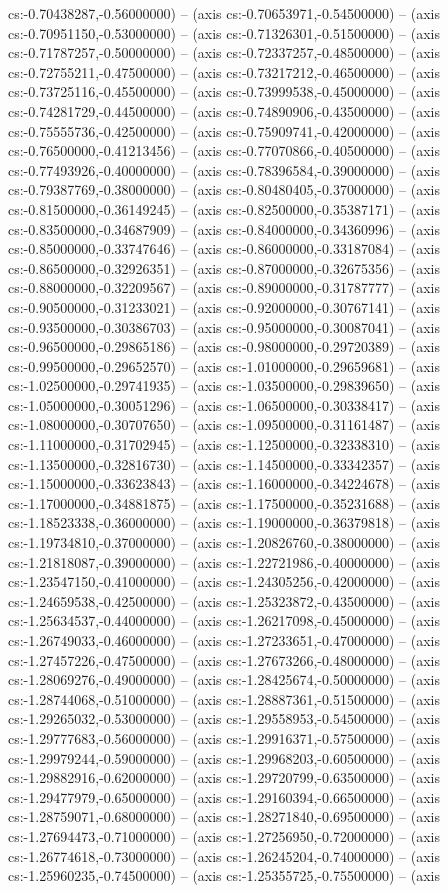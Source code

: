cs:-0.70438287,-0.56000000) -- (axis cs:-0.70653971,-0.54500000) -- (axis cs:-0.70951150,-0.53000000) -- (axis cs:-0.71326301,-0.51500000) -- (axis cs:-0.71787257,-0.50000000) -- (axis cs:-0.72337257,-0.48500000) -- (axis cs:-0.72755211,-0.47500000) -- (axis cs:-0.73217212,-0.46500000) -- (axis cs:-0.73725116,-0.45500000) -- (axis cs:-0.73999538,-0.45000000) -- (axis cs:-0.74281729,-0.44500000) -- (axis cs:-0.74890906,-0.43500000) -- (axis cs:-0.75555736,-0.42500000) -- (axis cs:-0.75909741,-0.42000000) -- (axis cs:-0.76500000,-0.41213456) -- (axis cs:-0.77070866,-0.40500000) -- (axis cs:-0.77493926,-0.40000000) -- (axis cs:-0.78396584,-0.39000000) -- (axis cs:-0.79387769,-0.38000000) -- (axis cs:-0.80480405,-0.37000000) -- (axis cs:-0.81500000,-0.36149245) -- (axis cs:-0.82500000,-0.35387171) -- (axis cs:-0.83500000,-0.34687909) -- (axis cs:-0.84000000,-0.34360996) -- (axis cs:-0.85000000,-0.33747646) -- (axis cs:-0.86000000,-0.33187084) -- (axis cs:-0.86500000,-0.32926351) -- (axis cs:-0.87000000,-0.32675356) -- (axis cs:-0.88000000,-0.32209567) -- (axis cs:-0.89000000,-0.31787777) -- (axis cs:-0.90500000,-0.31233021) -- (axis cs:-0.92000000,-0.30767141) -- (axis cs:-0.93500000,-0.30386703) -- (axis cs:-0.95000000,-0.30087041) -- (axis cs:-0.96500000,-0.29865186) -- (axis cs:-0.98000000,-0.29720389) -- (axis cs:-0.99500000,-0.29652570) -- (axis cs:-1.01000000,-0.29659681) -- (axis cs:-1.02500000,-0.29741935) -- (axis cs:-1.03500000,-0.29839650) -- (axis cs:-1.05000000,-0.30051296) -- (axis cs:-1.06500000,-0.30338417) -- (axis cs:-1.08000000,-0.30707650) -- (axis cs:-1.09500000,-0.31161487) -- (axis cs:-1.11000000,-0.31702945) -- (axis cs:-1.12500000,-0.32338310) -- (axis cs:-1.13500000,-0.32816730) -- (axis cs:-1.14500000,-0.33342357) -- (axis cs:-1.15000000,-0.33623843) -- (axis cs:-1.16000000,-0.34224678) -- (axis cs:-1.17000000,-0.34881875) -- (axis cs:-1.17500000,-0.35231688) -- (axis cs:-1.18523338,-0.36000000) -- (axis cs:-1.19000000,-0.36379818) -- (axis cs:-1.19734810,-0.37000000) -- (axis cs:-1.20826760,-0.38000000) -- (axis cs:-1.21818087,-0.39000000) -- (axis cs:-1.22721986,-0.40000000) -- (axis cs:-1.23547150,-0.41000000) -- (axis cs:-1.24305256,-0.42000000) -- (axis cs:-1.24659538,-0.42500000) -- (axis cs:-1.25323872,-0.43500000) -- (axis cs:-1.25634537,-0.44000000) -- (axis cs:-1.26217098,-0.45000000) -- (axis cs:-1.26749033,-0.46000000) -- (axis cs:-1.27233651,-0.47000000) -- (axis cs:-1.27457226,-0.47500000) -- (axis cs:-1.27673266,-0.48000000) -- (axis cs:-1.28069276,-0.49000000) -- (axis cs:-1.28425674,-0.50000000) -- (axis cs:-1.28744068,-0.51000000) -- (axis cs:-1.28887361,-0.51500000) -- (axis cs:-1.29265032,-0.53000000) -- (axis cs:-1.29558953,-0.54500000) -- (axis cs:-1.29777683,-0.56000000) -- (axis cs:-1.29916371,-0.57500000) -- (axis cs:-1.29979244,-0.59000000) -- (axis cs:-1.29968203,-0.60500000) -- (axis cs:-1.29882916,-0.62000000) -- (axis cs:-1.29720799,-0.63500000) -- (axis cs:-1.29477979,-0.65000000) -- (axis cs:-1.29160394,-0.66500000) -- (axis cs:-1.28759071,-0.68000000) -- (axis cs:-1.28271840,-0.69500000) -- (axis cs:-1.27694473,-0.71000000) -- (axis cs:-1.27256950,-0.72000000) -- (axis cs:-1.26774618,-0.73000000) -- (axis cs:-1.26245204,-0.74000000) -- (axis cs:-1.25960235,-0.74500000) -- (axis cs:-1.25355725,-0.75500000) -- (axis 